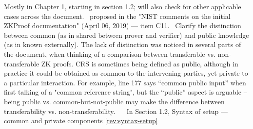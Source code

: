 \label{it:syntax-setup}
Mostly in Chapter 1, starting in section 1.2; will also check for other applicable cases across the document.
\newcol \ccontext\ proposed in the "NIST comments on the initial ZKProof documentation" (April 06, 2019) --- item C11.
				\propContrib\ Clarify the distinction between common (as in shared between prover and verifier) and public knowledge (as in known externally). The lack of distinction was noticed in several parts of the document, when thinking of a comparison between transferable vs. non-transferable ZK proofs. CRS is sometimes being defined as public, although in practice it could be obtained as common to the intervening parties, yet private to a particular interaction. For example, line 177 says ``common public input'' when first talking of a "common reference string", but the ``public'' aspect is arguable – being public vs. common-but-not-public may make the difference between transferability vs. non-transferability.
\newcol {}
\newcol \contributors\ \NISTPECteam
				\Chan\ In Section 1.2, Syntax of setup --- common and private components
\newcol \ref{rev:syntax-setup}
\rowendL
\myendIssue




